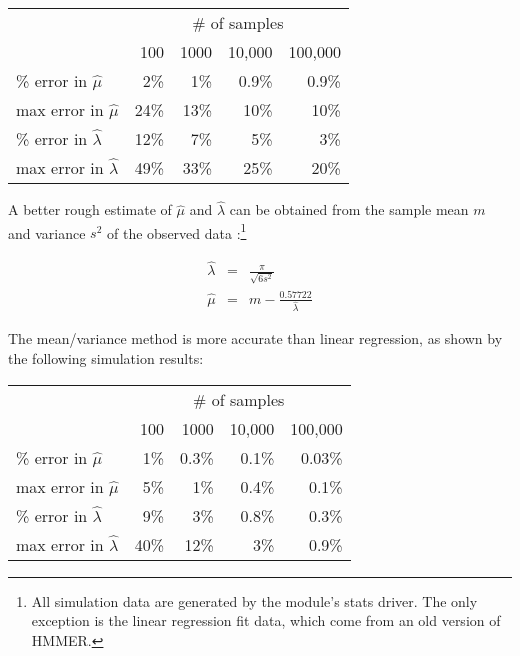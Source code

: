 \begin{center}
\begin{tabular}{lrrrr} \hline
                              & \multicolumn{4}{c}{\# of samples}\\
                              & 100 & 1000  & 10,000 & 100,000 \\
\% error in $\hat{\mu}$       &  2\%&   1\% & 0.9\%  &  0.9\%  \\
max error in $\hat{\mu}$      & 24\%&  13\% &  10\%  &   10\%  \\
\% error in $\hat{\lambda}$   & 12\%&   7\% &   5\%  &    3\%  \\
max error in $\hat{\lambda}$  & 49\%&  33\% &  25\%  &   20\%  \\ \hline
\end{tabular}
\end{center}


A better rough estimate of $\hat{\mu}$ and $\hat{\lambda}$ can be
obtained from the sample mean $m$ and variance $s^2$ of the observed
data \citep{Evans00}:\footnote{All simulation data are generated by
the  module's stats driver. The only exception is the
linear regression fit data, which come from an old version of HMMER.}

\begin{eqnarray*}
  \hat{\lambda} & = & \frac{\pi}{\sqrt{6s^2}}\\
  \hat{\mu}     & = & m - \frac{0.57722}{\hat{\lambda}}
\end{eqnarray*}

The mean/variance method is more accurate than linear regression, as
shown by the following simulation results:

\begin{center}
\begin{tabular}{lrrrr} \hline
                              & \multicolumn{4}{c}{\# of samples}\\
                              & 100 & 1000  & 10,000 & 100,000 \\
\% error in $\hat{\mu}$       &  1\%& 0.3\% &  0.1\% & 0.03\%  \\
max error in $\hat{\mu}$      &  5\%&   1\% &  0.4\% &  0.1\%  \\
\% error in $\hat{\lambda}$   &  9\%&   3\% &  0.8\% &  0.3\%  \\
max error in $\hat{\lambda}$  & 40\%&  12\% &    3\% &  0.9\%  \\ \hline
\end{tabular}
\end{center}

